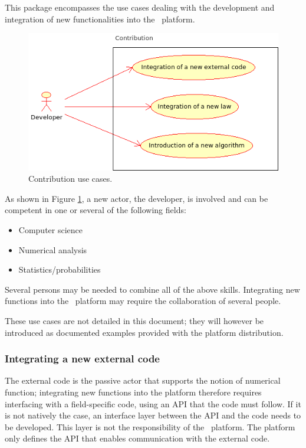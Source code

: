 This package encompasses the use cases dealing with the development and integration of new functionalities into the \OT\ platform.

\begin{figure}[htb]
  \begin{center}
    \includegraphics[scale=0.7]{Figures/analysis/contribution.png}
    \caption{Contribution use cases.}\label{fig:contribution}
  \end{center}
\end{figure}

As shown in Figure \ref{fig:contribution}, a new actor, the developer, is involved and can be competent in one or several of the following fields:
\begin{itemize}
\item Computer science
\item Numerical analysis
\item Statistics/probabilities
\end{itemize}

Several persons may be needed to combine all of the above skills. Integrating new functions into the \OT\ platform may require the collaboration of several people.

These use cases are not detailed in this document; they will however be introduced as documented examples provided with the platform distribution.

\subsubsection{Integrating a new external code}

The external code is the passive actor that supports the notion of numerical function; integrating new functions into the platform therefore requires interfacing with a field-specific code, using an API that the code must follow. If it is not natively the case, an interface layer between the API and the code needs to be developed. This layer is not the responsibility of the \OT\ platform. The platform only defines the API that enables communication with the external code.

